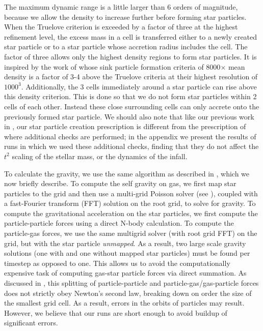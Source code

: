 \documentclass[../dissertation.tex]{subfiles}
\begin{document}
The maximum dynamic range is a little larger than 6 orders of magnitude, because we allow the density to increase further before forming star particles.
When the Truelove criterion is exceeded by a factor of three at the highest refinement level, the excess 
mass in a cell is transferred either to a newly created star particle or to a 
star particle whose accretion radius includes the cell. The factor of three allows only the highest density regions to form star particles.  It is inspired by the work of \citet{2011ApJ...730...40P} whose sink particle formation criteria of 8000$\times$ mean density is a factor of 3-4 above the Truelove criteria at their highest resolution of $1000^3$. 
Additionally, the 3 cells immediately around a star particle can rise above this density criterion. 
This is done so that we do not form star particles within 2 cells of each other. 
Instead these close surrounding cells can only accrete onto the previously formed star particle.
We should also note that like our previous work in \citet{2015ApJ...800...49L}, our star particle 
creation prescription is different from the prescription of 
 \citet{2010ApJ...713..269F} where additional checks are performed; in the appendix
we present the results of runs in which we used these additional checks, finding that they
do not affect the $t^2$ scaling of the stellar mass, or the dynamics of the infall.

To calculate the gravity, we use the same algorithm as described in 
\citet{2015ApJ...800...49L}, which we now briefly describe. 
To compute the self gravity on gas, we first map star particles 
to the grid and then use a multi-grid Poisson solver 
(see \citealt{2008ApJS..176..293R}), coupled with a fast-Fourier 
transform (FFT) solution on the root grid, to solve for gravity.  
To compute the gravitational acceleration on the star particles, 
we first compute the particle-particle forces using a direct N-body calculation.  
To compute the particle-gas forces, we use the same multigrid solver 
(with root grid FFT) on the grid, but with the star particle {\it unmapped}.   
As a result, two large scale gravity solutions (one with and one without 
mapped star particles) must be found per timestep as opposed to one.
This allows us to avoid the computationally expensive task of computing 
gas-star particle forces via direct summation. As discussed in \citet{2015ApJ...800...49L}, this splitting of particle-particle and particle-gas/gas-particle forces does not strictly obey Newton's second law, breaking down on order the size of the smallest grid cell.  As a result, errors in the orbits of particles may result.   However, we believe that our runs are short enough to avoid buildup of significant errors. 
\end{document}
